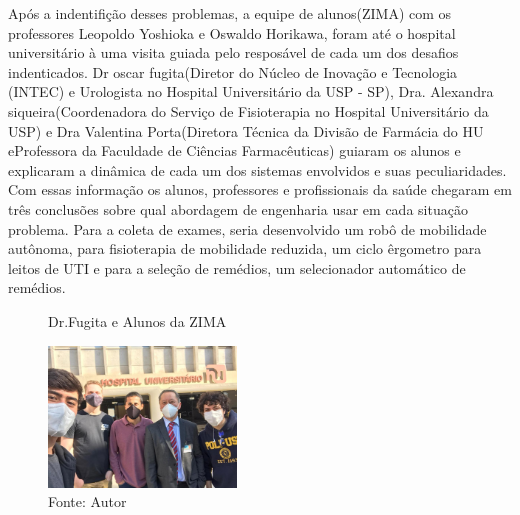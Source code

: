 \documentclass[../poliXuniversity_hospital_(USP)_report.tex]{subfiles}
\begin{document}
Após a indentifição desses problemas, a equipe de alunos(ZIMA) com os professores Leopoldo Yoshioka e Oswaldo Horikawa, foram até o hospital universitário à uma visita guiada pelo resposável de cada um dos desafios indenticados. Dr oscar fugita(Diretor do Núcleo de Inovação e Tecnologia (INTEC) e Urologista no Hospital Universitário da USP - SP), Dra. Alexandra siqueira(Coordenadora do Serviço de Fisioterapia no Hospital Universitário da USP) e Dra Valentina Porta(Diretora Técnica da Divisão de Farmácia do HU eProfessora da Faculdade de Ciências Farmacêuticas) guiaram os alunos e explicaram a dinâmica de cada um dos sistemas envolvidos e suas peculiaridades. Com essas informação os alunos, professores e profissionais da saúde chegaram em três conclusões sobre qual abordagem de engenharia usar em cada situação problema. Para a coleta de exames, seria desenvolvido um robô de mobilidade autônoma, para fisioterapia de mobilidade reduzida, um ciclo êrgometro para leitos de UTI e para a seleção de remédios, um selecionador automático de remédios.

\begin{figure}[h]
\centering
    \caption{Dr.Fugita e Alunos da ZIMA}
    \centering %
    \includegraphics[width=5cm]{images/visita_HU.jpeg}
    \caption*{Fonte: Autor}
    \label{figura:Visita ao HU}
\end{figure}
\end{document}
